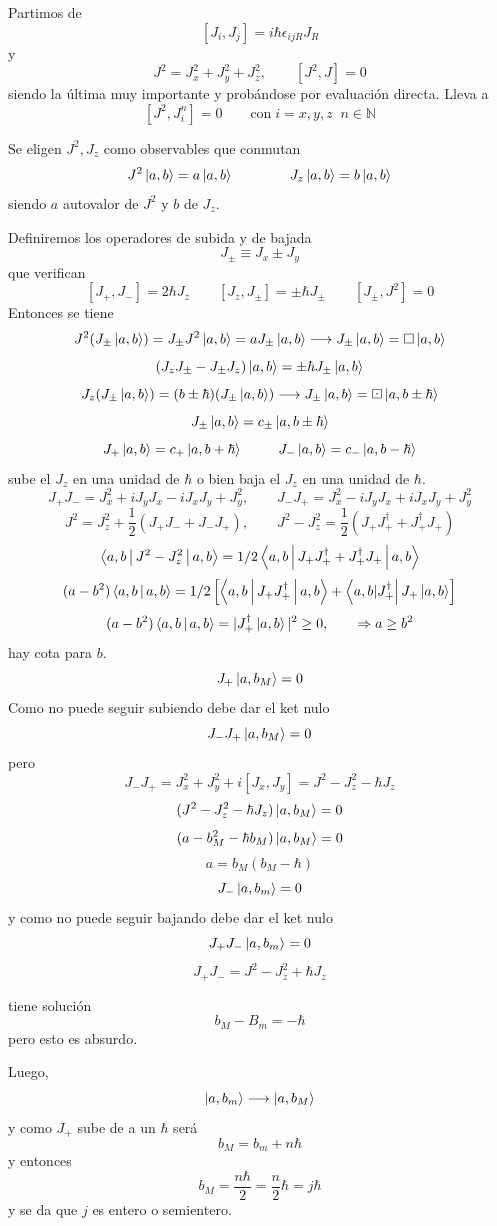 \documentclass[10pt,oneside]{CBFT_book}
\begin{document}
Partimos de 
\[
	[J_i, J_j] =  i\hbar \epsilon_{ijR}J_R
\]
y
\[
	J^2 = J^2_x + J^2_y + J^2_z, \qquad  [J^2,J] = 0
\]
siendo la última muy importante y probándose por evaluación directa. Lleva a 
\[
	[J^2,J_i^n] = 0 \qquad \text{con} \; i=x,y,z \;\; n\in\mathbb{N}
\]

Se eligen $J^2, J_z$ como observables que conmutan 
\[
	J^2 \Ket{a,b} = a\Ket{a,b} \qquad \qquad J_z \Ket{a,b} = b\Ket{a,b}
\]
siendo $a$ autovalor de $J^2$ y $b$ de $J_z$.

Definiremos los operadores de subida y de bajada
\[
	J_{\pm} \equiv J_x \pm J_y
\]
que verifican 
\[
	[ J_+, J_- ] = 2\hbar J_z \qquad [ J_z, J_\pm]= \pm \hbar J_{\pm} \qquad [J_{\pm}, J^2 ] = 0
\]
Entonces se tiene 
\[
	J^2( J_\pm \Ket{a,b}) = J_\pm J^2 \Ket{a,b} = a J_\pm \Ket{a,b} \longrightarrow 
		J_\pm \Ket{a,b} = \Box \Ket{a,b}
\]
\[
	(J_zJ_\pm - J_\pm J_z) \Ket{a,b} = \pm\hbar J_\pm \Ket{a,b}
\]
\[
	J_z (J_\pm \Ket{a,b}) = (b\pm\hbar)(J_\pm \Ket{a,b}) \longrightarrow 
		J_\pm \Ket{a,b} = \boxdot \Ket{a,b\pm\hbar}
\]
\[
	J_{\pm} \Ket{a,b} = c_{\pm} \Ket{a,b\pm\hbar}
\]
\[
	J_+\Ket{a,b} = c_+\Ket{a,b+\hbar} \;\qquad\; J_-\Ket{a,b} =  c_- \Ket{a,b-\hbar}
\]
sube el $J_z$ en una unidad de $\hbar$ o bien baja el $J_z$ en una unidad de $\hbar$.
\[
	J_+J_- = J_x^2 + iJ_yJ_x - iJ_xJ_y + J_y^2 , \qquad J_-J_+ = J_x^2 - iJ_yJ_x + iJ_xJ_y + J_y^2
\]
\[
	J^2 = J_z^2 + \frac{1}{2}(J_+J_- + J_-J_+ ) , \qquad 
		J^2 - J_z^2 = \frac{1}{2}(J_+J_+^\dagger + J_+^\dagger J_+ )
\]
\[
	\Braket{a,b|J^2 - J^2_z|a,b} =  1/2 \Braket{a,b|J_+J_+^\dagger + J_+^\dagger J_+|a,b}
\]
\[
	(a-b^2)\Braket{a,b|a,b} = 1/2 \left[ \Braket{a,b|J_+J_+^\dagger|a,b} + 
		\Bra{a,b|J_+^\dagger} J_+\Ket{a,b} \right] 
\]
\[
	(a-b^2)\Braket{a,b|a,b} = |J_+^\dagger\Ket{a,b}|^2 \geq 0, \qquad \Rightarrow a \geq b^2
\]
hay cota para $b$.
\[
	J_+ \Ket{a,b_M} = 0
\]
Como no puede seguir subiendo debe dar el ket nulo 
\[
	J_-J_+ \Ket{a,b_M} = 0
\]
pero
\[
	J_-J_+ = J^2_x + J^2_y + i[J_x, J_y]  = J^2 - J^2_z - \hbar J_z
\]
\[
	( J^2 - J^2_z  -\hbar J_z) \Ket{a,b_M}  = 0	
\]
\[
	( a - b_M^2 - \hbar b_M ) \Ket{a,b_M}  = 0	
\]
\[
	a = b_M ( b_M -\hbar )
\]
\[
	J_- \Ket{a,b_m} = 0
\]
y como no puede seguir bajando debe dar el ket nulo
\[
	J_+J_- \Ket{a,b_m} = 0
\]
\[
	J_+J_- =  J^2 - J^2_z + \hbar J_z
\]

tiene solución 
\[
	b_M - B_m = - \hbar
\]
pero esto es absurdo.

Luego,
\[
	\Ket{a,b_m} \longrightarrow \Ket{a,b_M}
\]
y como $J_+$ sube de a un $\hbar$ será
\[
	b_M = b_m + n\hbar
\]
y entonces
\[
	b_M = \frac{n\hbar}{2} = \frac{n}{2} \hbar = j \hbar
\]
y se da que $j$ es entero o semientero.
\end{document}
